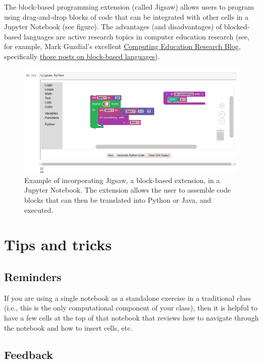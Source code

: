 \documentclass[]{book}
\begin{document}
The block-based programming extension (called Jigsaw) allows users to
program using drag-and-drop blocks of code that can be integrated with
other cells in a Jupyter Notebook (see figure). The advantages (and
disadvantages) of blocked-based languages are active research topics in
computer education research (see, for example, Mark Guzdial's excellent
\href{https://computinged.wordpress.com/}{Computing Education Research
Blog}, specifically
\href{https://computinged.wordpress.com/tag/blocks-based-language/}{those
posts on block-based languages}).

\begin{figure}
\centering
\includegraphics{images/jigsaw.png}
\caption{Example of incorporating Jigsaw, a block-based extension, in a
Jupyter Notebook. The extension allows the user to assemble code blocks
that can then be translated into Python or Java, and executed.}
\end{figure}

\section{Tips and tricks}\label{tips-and-tricks}

\subsection{Reminders}\label{reminders}

If you are using a single notebook as a standalone exercise in a
traditional class (i.e., this is the only computational component of
your class), then it is helpful to have a few cells at the top of that
notebook that reviews how to navigate through the notebook and how to
insert cells, etc.

\subsection{Feedback}\label{feedback}
\end{document}

